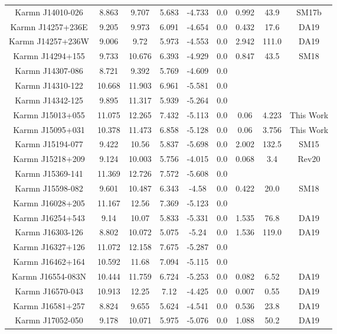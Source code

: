\begin{longtable}{ccccccccc}
    Karmn J14010-026 & 8.863 & 9.707 & 5.683 & -4.733 & 0.0 & 0.992 & 43.9 & SM17b \\
    Karmn J14257+236E & 9.205 & 9.973 & 6.091 & -4.654 & 0.0 & 0.432 & 17.6 & DA19 \\
    Karmn J14257+236W & 9.006 & 9.72 & 5.973 & -4.553 & 0.0 & 2.942 & 111.0 & DA19 \\
    Karmn J14294+155 & 9.733 & 10.676 & 6.393 & -4.929 & 0.0 & 0.847 & 43.5 & SM18 \\
    Karmn J14307-086 & 8.721 & 9.392 & 5.769 & -4.609 & 0.0 &  &  &  \\
    Karmn J14310-122 & 10.668 & 11.903 & 6.961 & -5.581 & 0.0 &  &  &  \\
    Karmn J14342-125 & 9.895 & 11.317 & 5.939 & -5.264 & 0.0 &  &  &  \\
    Karmn J15013+055 & 11.075 & 12.265 & 7.432 & -5.113 & 0.0 & 0.06 & 4.223 & This Work \\
    Karmn J15095+031 & 10.378 & 11.473 & 6.858 & -5.128 & 0.0 & 0.06 & 3.756 & This Work \\
    Karmn J15194-077 & 9.422 & 10.56 & 5.837 & -5.698 & 0.0 & 2.002 & 132.5 & SM15 \\
    Karmn J15218+209 & 9.124 & 10.003 & 5.756 & -4.015 & 0.0 & 0.068 & 3.4 & Rev20 \\
    Karmn J15369-141 & 11.369 & 12.726 & 7.572 & -5.608 & 0.0 &  &  &  \\
    Karmn J15598-082 & 9.601 & 10.487 & 6.343 & -4.58 & 0.0 & 0.422 & 20.0 & SM18 \\
    Karmn J16028+205 & 11.167 & 12.56 & 7.369 & -5.123 & 0.0 &  &  &  \\
    Karmn J16254+543 & 9.14 & 10.07 & 5.833 & -5.331 & 0.0 & 1.535 & 76.8 & DA19 \\
    Karmn J16303-126 & 8.802 & 10.072 & 5.075 & -5.24 & 0.0 & 1.536 & 119.0 & DA19 \\
    Karmn J16327+126 & 11.072 & 12.158 & 7.675 & -5.287 & 0.0 &  &  &  \\
    Karmn J16462+164 & 10.592 & 11.68 & 7.094 & -5.115 & 0.0 &  &  &  \\
    Karmn J16554-083N & 10.444 & 11.759 & 6.724 & -5.253 & 0.0 & 0.082 & 6.52 & DA19 \\
    Karmn J16570-043 & 10.913 & 12.25 & 7.12 & -4.425 & 0.0 & 0.007 & 0.55 & DA19 \\
    Karmn J16581+257 & 8.824 & 9.655 & 5.624 & -4.541 & 0.0 & 0.536 & 23.8 & DA19 \\
    Karmn J17052-050 & 9.178 & 10.071 & 5.975 & -5.076 & 0.0 & 1.088 & 50.2 & DA19 \\

\end{longtable}
